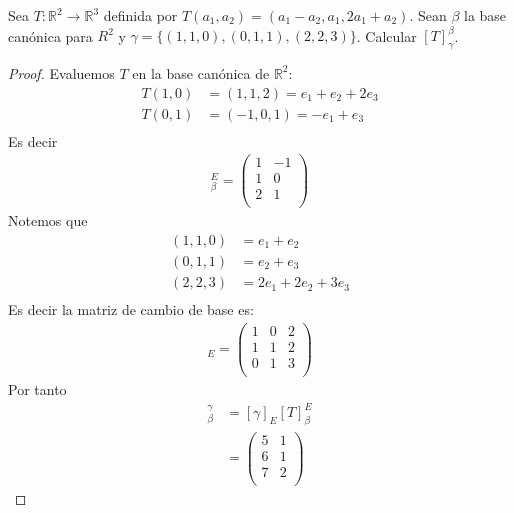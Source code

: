 \documentclass[11pt]{article}
\numberwithin{equation}{section}
\newcommand{\R}{\mathbb{R}}
\begin{document}
\begin{Problema}{} Sea $T: \R^2 \to \R^3$ definida por $T(a_1, a_2) = (a_1 - a_2, a_1, 2a_1 + a_2)$. 
    Sean $\beta$ la base canónica para $R^2$ y $\gamma = \{(1,1,0), (0,1,1), (2,2,3)\}$. 
    Calcular $[T]_{\gamma}^\beta$.
\end{Problema}
\begin{proof}
    Evaluemos $T$ en la base canónica de $\R^2$:
    \begin{align*}
        T(1,0)&=(1,1,2)=e_1+e_2+2e_3\\
        T(0,1)&=(-1,0,1)=-e_1+e_3\\
    \end{align*}
Es decir
\begin{align*}
    [T]_\beta^E=\begin{pmatrix}
        1 & -1 \\
        1 & 0 \\
        2 & 1 \\
    \end{pmatrix}
\end{align*}
Notemos que
\begin{align*}
    (1,1,0)&=e_1+e_2\\
    (0,1,1)&=e_2+e_3\\
    (2,2,3)&=2e_1+2e_2+3e_3\\
\end{align*}
Es decir la matriz de cambio de base es:
\begin{align*}
    [\gamma]_{E}=\begin{pmatrix}
        1 & 0 & 2 \\
        1 & 1 & 2 \\
        0 & 1 & 3 \\
    \end{pmatrix}
\end{align*}
Por tanto 
\begin{align*}
    [T]_\beta^\gamma&=[\gamma]_{E}[T]_\beta^E\\
    &=\begin{pmatrix}
        5 & 1 \\
        6 & 1 \\
        7 & 2 \\
    \end{pmatrix}
\end{align*}
\end{proof}
\end{document}

